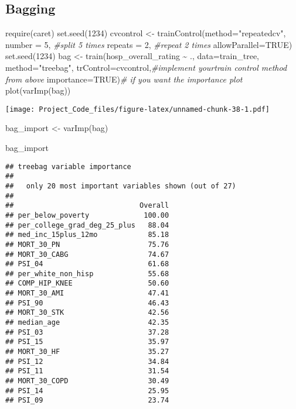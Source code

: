 \documentclass[
]{article}
\newenvironment{Shaded}{\begin{snugshade}}{\end{snugshade}}
\newcommand{\AttributeTok}[1]{\textcolor[rgb]{0.77,0.63,0.00}{#1}}
\newcommand{\CommentTok}[1]{\textcolor[rgb]{0.56,0.35,0.01}{\textit{#1}}}
\newcommand{\ConstantTok}[1]{\textcolor[rgb]{0.00,0.00,0.00}{#1}}
\newcommand{\DecValTok}[1]{\textcolor[rgb]{0.00,0.00,0.81}{#1}}
\newcommand{\FunctionTok}[1]{\textcolor[rgb]{0.00,0.00,0.00}{#1}}
\newcommand{\NormalTok}[1]{#1}
\newcommand{\OtherTok}[1]{\textcolor[rgb]{0.56,0.35,0.01}{#1}}
\newcommand{\SpecialCharTok}[1]{\textcolor[rgb]{0.00,0.00,0.00}{#1}}
\newcommand{\StringTok}[1]{\textcolor[rgb]{0.31,0.60,0.02}{#1}}
\begin{document}
\hypertarget{bagging}{%
\subsection{Bagging}\label{bagging}}

\begin{Shaded}
\begin{Highlighting}[]
\FunctionTok{require}\NormalTok{(caret)}
\FunctionTok{set.seed}\NormalTok{(}\DecValTok{1234}\NormalTok{)}
\NormalTok{cvcontrol }\OtherTok{\textless{}{-}} \FunctionTok{trainControl}\NormalTok{(}\AttributeTok{method=}\StringTok{"repeatedcv"}\NormalTok{, }
                          \AttributeTok{number =} \DecValTok{5}\NormalTok{, }\CommentTok{\#split 5 times}
                          \AttributeTok{repeats =} \DecValTok{2}\NormalTok{, }\CommentTok{\#repeat 2 times}
                          \AttributeTok{allowParallel=}\ConstantTok{TRUE}\NormalTok{)}
\FunctionTok{set.seed}\NormalTok{(}\DecValTok{1234}\NormalTok{)}
\NormalTok{bag }\OtherTok{\textless{}{-}} \FunctionTok{train}\NormalTok{(hosp\_overall\_rating }\SpecialCharTok{\textasciitilde{}}\NormalTok{ ., }
             \AttributeTok{data=}\NormalTok{train\_tree,}
             \AttributeTok{method=}\StringTok{"treebag"}\NormalTok{,}
             \AttributeTok{trControl=}\NormalTok{cvcontrol,}\CommentTok{\#implement yourtrain control method from above}
             \AttributeTok{importance=}\ConstantTok{TRUE}\NormalTok{)}\CommentTok{\# if you want the importance plot}
\FunctionTok{plot}\NormalTok{(}\FunctionTok{varImp}\NormalTok{(bag))}
\end{Highlighting}
\end{Shaded}

\texttt{[image: Project\_Code\_files/figure-latex/unnamed-chunk-38-1.pdf]}

\begin{Shaded}
\begin{Highlighting}[]
\NormalTok{bag\_import }\OtherTok{\textless{}{-}} \FunctionTok{varImp}\NormalTok{(bag)}

\NormalTok{bag\_import}
\end{Highlighting}
\end{Shaded}

\begin{verbatim}
## treebag variable importance
## 
##   only 20 most important variables shown (out of 27)
## 
##                              Overall
## per_below_poverty             100.00
## per_college_grad_deg_25_plus   88.04
## med_inc_15plus_12mo            85.18
## MORT_30_PN                     75.76
## MORT_30_CABG                   74.67
## PSI_04                         61.68
## per_white_non_hisp             55.68
## COMP_HIP_KNEE                  50.60
## MORT_30_AMI                    47.41
## PSI_90                         46.43
## MORT_30_STK                    42.56
## median_age                     42.35
## PSI_03                         37.28
## PSI_15                         35.97
## MORT_30_HF                     35.27
## PSI_12                         34.84
## PSI_11                         31.54
## MORT_30_COPD                   30.49
## PSI_14                         25.95
## PSI_09                         23.74
\end{verbatim}
\end{document}
